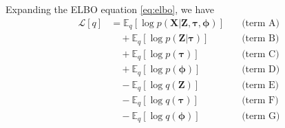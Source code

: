 \documentclass{article}
\let\vec\boldsymbol
\begin{document}
Expanding the ELBO equation \ref{eq:elbo}, we have
\begin{align}
    \mathcal{L} [q] &= \mathbb{E}_{q} \left[ \log p \left( \vec{X} | \vec{Z}, \boldsymbol{\tau}, \boldsymbol{\phi} \right) \right] \quad &\text{(term A)} \\
    &\quad + \mathbb{E}_{q} \left[ \log p \left( \vec{Z} | \boldsymbol{\tau} \right) \right] \quad &\text{(term B)} \\
    &\quad + \mathbb{E}_{q} \left[ \log p \left( \boldsymbol{\tau} \right) \right] \quad &\text{(term C)} \\
    &\quad + \mathbb{E}_{q} \left[ \log p \left( \boldsymbol{\phi} \right) \right] \quad &\text{(term D)} \\
    &\quad - \mathbb{E}_{q} \left[ \log q \left( \vec{Z} \right) \right] \quad &\text{(term E)} \\
    &\quad - \mathbb{E}_{q} \left[ \log q \left( \boldsymbol{\tau} \right) \right] \quad &\text{(term F)} \\
    &\quad - \mathbb{E}_{q} \left[ \log q \left( \boldsymbol{\phi} \right) \right] \quad &\text{(term G)}
\end{align}
\end{document}
